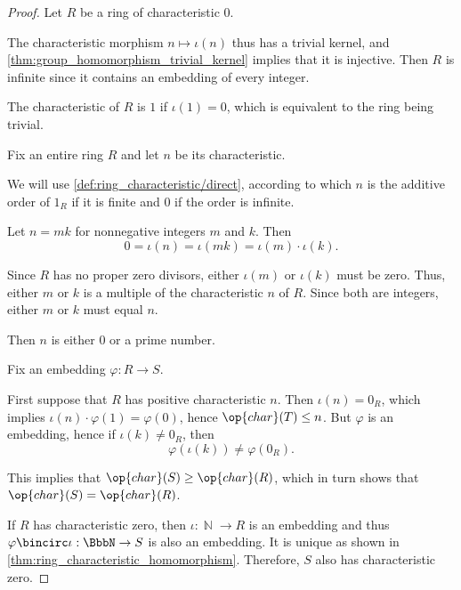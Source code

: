 \begin{proof}
   Let \( R \) be a ring of characteristic \( 0 \).

  The characteristic morphism \( n \mapsto \iota(n) \) thus has a trivial kernel, and \cref{thm:group_homomorphism_trivial_kernel} implies that it is injective. Then \( R \) is infinite since it contains an embedding of every integer.

   The characteristic of \( R \) is \( 1 \) if \( \iota(1) = 0 \), which is equivalent to the ring being trivial.

   Fix an entire ring \( R \) and let \( n \) be its characteristic.

  We will use \cref{def:ring_characteristic/direct}, according to which \( n \) is the additive order of \( 1_R \) if it is finite and \( 0 \) if the order is infinite.

  Let \( n = mk \) for nonnegative integers \( m \) and \( k \). Then
  \begin{equation*}
    0 = \iota(n) = \iota(mk) = \iota(m) \cdot \iota(k).
  \end{equation*}

  Since \( R \) has no proper zero divisors, either \( \iota(m) \) or \( \iota(k) \) must be zero. Thus, either \( m \) or \( k \) is a multiple of the characteristic \( n \) of \( R \). Since both are integers, either \( m \) or \( k \) must equal \( n \).

  Then \( n \) is either \( 0 \) or a prime number.

   Fix an embedding \( \varphi: R \to S \).

  First suppose that \( R \) has positive characteristic \( n \). Then \( \iota(n) = 0_R \), which implies \( \iota(n) \cdot \varphi(1) = \varphi(0) \), hence \( \op{char}(T) \leq n \). But \( \varphi \) is an embedding, hence if \( \iota(k) \neq 0_R \), then
  \begin{equation*}
    \varphi(\iota(k)) \neq \varphi(0_R).
  \end{equation*}

  This implies that \( \op{char}(S) \geq \op{char}(R) \), which in turn shows that \( \op{char}(S) = \op{char}(R) \).

  If \( R \) has characteristic zero, then \( \iota: \BbbN \to R \) is an embedding and thus \( \varphi \bincirc \iota: \BbbN \to S \) is also an embedding. It is unique as shown in \cref{thm:ring_characteristic_homomorphism}. Therefore, \( S \) also has characteristic zero.
\end{proof}

